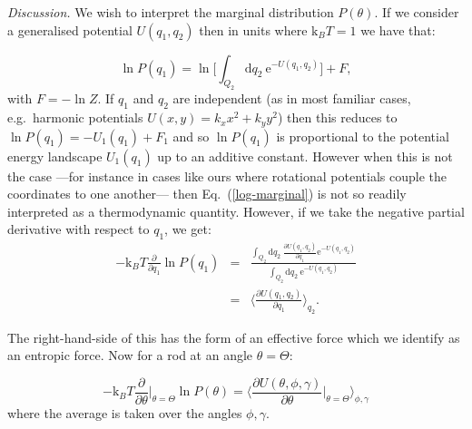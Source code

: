 \documentclass[aps,prl,twocolumn,superscriptaddress]{revtex4-1}
\newcommand{\dd}{\mathrm{d}}
\newcommand{\ee}{\mathrm{e}}
\newcommand{\kk}{\mathrm{k}_B}
\begin{document}
 
%
%
%
%
%
%
%
\emph{Discussion.} We wish to interpret the marginal distribution $P(\theta)$. If we consider a generalised potential $U(q_1,q_2)$ then in units where $\kk T=1$ we have that:

\begin{equation}\label{log-marginal}
\ln{P(q_1)} = \ln\Big[ \int_{Q_2} \dd q_2\ \ee^{-U(q_1,q_2)} \Big] + F,
\end{equation}with $F=-\ln Z$. If $q_1$ and $q_2$ are independent (as in most familiar cases, e.g.\ harmonic potentials $U(x,y)= k_x x^2 + k_y y^2$) then this reduces to $\ln P(q_1)  = -U_1(q_1) + F_1$ and so $\ln P(q_1)$ is proportional to the potential energy landscape $U_1(q_1)$ up to an additive constant. However when this is not the case ---for instance in cases like ours where rotational potentials couple the coordinates to one another--- then Eq.\ (\ref{log-marginal}) is not so readily interpreted as a thermodynamic quantity. However, if we take the negative partial derivative with respect to $q_1$, we get:
\begin{eqnarray}
-\kk T\frac{\partial }{\partial q_1} \ln{P(q_1)} & = & \frac{\int_{Q_2} \dd q_2 \ \frac{\partial U(q_1,q_2)}{\partial q_1} \ee^{-U(q_1,q_2)} }{\int_{Q_2} \dd q_2 \  \ee^{-U(q_1,q_2)}}\nonumber \\ 
& = & \Big\langle \frac{\partial U(q_1,q_2)}{\partial q_1} \Big\rangle_{q_2}.
\end{eqnarray}

The right-hand-side of this has the form of an effective force which we identify as an entropic force. Now for a rod at an angle $\theta=\Theta$:

\begin{equation} \label{entropicforce}
-\kk T\frac{\partial }{\partial \theta}\Big|_{\theta=\Theta} \ln{P(\theta)}  = \Big\langle \frac{\partial U(\theta,\phi,\gamma)}{\partial \theta}\Big|_{\theta=\Theta} \Big\rangle_{\phi,\gamma}
\end{equation}where the average is taken over the angles $\phi,\gamma$.
\end{document}
